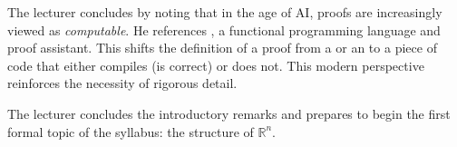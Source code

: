 \begin{didactic-insight}
The lecturer concludes by noting that in the age of AI, proofs are increasingly viewed as \emph{computable}. He references , a functional programming language and proof assistant. This shifts the definition of a proof from a  or an  to a piece of code that either compiles (is correct) or does not. This modern perspective reinforces the necessity of rigorous detail.
\end{didactic-insight}

\begin{meta-note}
The lecturer concludes the introductory remarks and prepares to begin the first formal topic of the syllabus: the structure of $\mathbb{R}^n$.
\end{meta-note}
